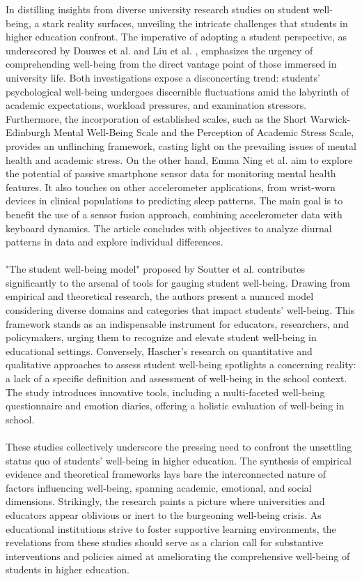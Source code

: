 \documentclass[11pt]{report}
\begin{document}
In distilling insights from diverse university research studies on student well-being, a stark reality surfaces, unveiling the intricate challenges that students in higher education confront. The imperative of adopting a student perspective, as underscored by Douwes et al. \cite{research-1} and Liu et al. \cite{research-2}, emphasizes the urgency of comprehending well-being from the direct vantage point of those immersed in university life. Both investigations expose a disconcerting trend: students' psychological well-being undergoes discernible fluctuations amid the labyrinth of academic expectations, workload pressures, and examination stressors. Furthermore, the incorporation of established scales, such as the Short Warwick-Edinburgh Mental Well-Being Scale and the Perception of Academic Stress Scale, provides an unflinching framework, casting light on the prevailing issues of mental health and academic stress. On the other hand, Emma Ning et al. \cite{research-3} aim to explore the potential of passive smartphone sensor data for monitoring mental health features. It also touches on other accelerometer applications, from wrist-worn devices in clinical populations to predicting sleep patterns. The main goal is to benefit the use of a sensor fusion approach, combining accelerometer data with keyboard dynamics. The article concludes with objectives to analyze diurnal patterns in data and explore individual differences.\\ \\
"The student well-being model" proposed by Soutter et al. \cite{research-4} contributes significantly to the arsenal of tools for gauging student well-being. Drawing from empirical and theoretical research, the authors present a nuanced model considering diverse domains and categories that impact students' well-being. This framework stands as an indispensable instrument for educators, researchers, and policymakers, urging them to recognize and elevate student well-being in educational settings. Conversely, Hascher's \cite{research-5} research on quantitative and qualitative approaches to assess student well-being spotlights a concerning reality: a lack of a specific definition and assessment of well-being in the school context. The study introduces innovative tools, including a multi-faceted well-being questionnaire and emotion diaries, offering a holistic evaluation of well-being in school.\\ \\
These studies collectively underscore the pressing need to confront the unsettling status quo of students' well-being in higher education. The synthesis of empirical evidence and theoretical frameworks lays bare the interconnected nature of factors influencing well-being, spanning academic, emotional, and social dimensions. Strikingly, the research paints a picture where universities and educators appear oblivious or inert to the burgeoning well-being crisis. As educational institutions strive to foster supportive learning environments, the revelations from these studies should serve as a clarion call for substantive interventions and policies aimed at ameliorating the comprehensive well-being of students in higher education.
\end{document}
